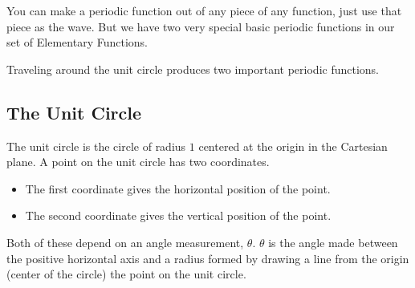 \documentclass{ximera}
\begin{document}
You can make a periodic function out of any piece of any function, just use that piece as the wave. But we have two very special basic periodic functions in our set of Elementary Functions.



Traveling around the unit circle produces two important periodic functions.









































\subsection*{The Unit Circle}
\hfill\break


The unit circle is the circle of radius $1$ centered at the origin in the Cartesian plane. A point on the unit circle has two coordinates.  

\begin{itemize}
\item The first coordinate gives the horizontal position of the point. 
\item The second coordinate gives the vertical position of the point.  
\end{itemize}

Both of these depend on an angle measurement, $\theta$. $\theta$ is the angle made between the positive horizontal axis and a radius formed by drawing a line from the origin (center of the circle) the point on the unit circle.
\end{document}
